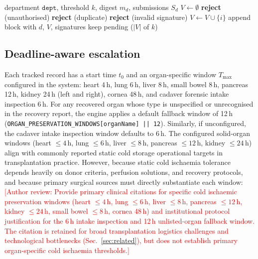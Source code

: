 \documentclass[journal]{IEEEtran}
\newcommand{\todo}[1]{\textcolor{red}{[#1]}}
\begin{document}
\begin{algorithm}[t]
\caption{Threshold approval check (reference verifier)}
\label{alg:threshold}
\begin{algorithmic}[1]
\Require department $\texttt{dept}$, threshold $k$, digest $m_d$, submissions $S_d$
\State $V \gets \emptyset$
   \State \textbf{reject} (unauthorised)
  \EndIf
   \State \textbf{reject} (duplicate)
  \EndIf
   \State \textbf{reject} (invalid signature)
  \EndIf
  \State $V \gets V \cup \{i\}$
\EndFor
{} \State append block with $d$, $V$, signatures
\Else \State keep pending ($|V|$ of $k$)
\EndIf
\end{algorithmic}
\end{algorithm}

\subsection{Deadline-aware escalation}
Each tracked record has a start time $t_0$ and an organ-specific window
$T_{\max}$ configured in the system: heart 4\,h, lung 6\,h, liver 8\,h,
small bowel 8\,h, pancreas 12\,h, kidney 24\,h (left and right), cornea 48\,h,
and cadaver forensic intake inspection 6\,h. For any recovered organ whose
type is unspecified or unrecognised in the recovery report, the engine applies
a default fallback window of 12\,h (\texttt{ORGAN\_PRESERVATION\_WINDOWS[organName] || 12}).
Similarly, if unconfigured, the cadaver intake inspection window defaults to 6\,h.
The configured solid-organ windows (heart $\le 4$\,h, lung $\le 6$\,h, liver $\le 8$\,h,
pancreas $\le 12$\,h, kidney $\le 24$\,h) align with commonly reported static cold
storage operational targets in transplantation practice. However, because static
cold ischaemia tolerance depends heavily on donor criteria, perfusion solutions,
and recovery protocols, and because primary surgical sources must directly substantiate
each window:
\todo{Author review: Provide primary clinical citations for specific cold ischaemic preservation windows (heart $\le 4$\,h, lung $\le 6$\,h, liver $\le 8$\,h, pancreas $\le 12$\,h, kidney $\le 24$\,h, small bowel $\le 8$\,h, cornea 48\,h) and institutional protocol justification for the 6\,h intake inspection and 12\,h unlisted-organ fallback window. The citation \cite{patil2026} is retained for broad transplantation logistics challenges and technological bottlenecks (Sec.~\ref{sec:related}), but does not establish primary organ-specific cold ischaemia thresholds.}
\end{document}
